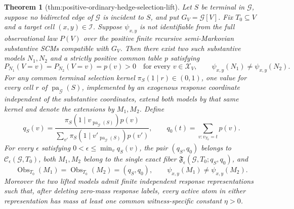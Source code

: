 \documentclass{article}
\newtheorem{theorem}{Theorem}
\begin{document}
\begin{theorem}[thm:positive-ordinary-hedge-selection-lift]\label{thm:positive-ordinary-hedge-selection-lift}
Let \(S\) be terminal in \(\mathcal G\), suppose no bidirected edge of \(\mathcal G\) is incident to \(S\), and put \(G_V=\mathcal G[V]\). Fix \(T_0\subseteq V\) and a target cell \((x,y)\in\mathcal I\). Suppose \(\psi_{x,y}\) is not identifiable from the full observational law \(P(V)\) over the positive finite recursive semi-Markovian substantive SCMs compatible with \(G_V\). Then there exist two such substantive models \(N_1,N_2\) and a strictly positive common table \(p\) satisfying
\[
 P_{N_1}(V=v)=P_{N_2}(V=v)=p(v)>0\quad\text{for every }v\in\mathcal X_V,
 \qquad
 \psi_{x,y}(N_1)\ne\psi_{x,y}(N_2).
\]
For any common terminal selection kernel \(\pi_S(1\mid r)\in(0,1)\), one value for every cell \(r\) of \(\operatorname{pa}_{\mathcal G}(S)\), implemented by an exogenous response coordinate independent of the substantive coordinates, extend both models by that same kernel and denote the extensions by \(M_1,M_2\). Define
\[
 q_S(v)=\frac{\pi_S(1\mid v_{\operatorname{pa}_{\mathcal G}(S)})p(v)}
 {\sum_{v'}\pi_S(1\mid v'_{\operatorname{pa}_{\mathcal G}(S)})p(v')},
 \qquad
 q_0(t)=\sum_{v:v_{T_0}=t}p(v).
\]
For every \(\epsilon\) satisfying \(0<\epsilon\leq\min_v q_S(v)\), the pair \((q_S,q_0)\) belongs to \(\mathcal C_{\epsilon}(\mathcal G,T_0)\), both \(M_1,M_2\) belong to the single exact fiber \(\mathfrak F_{\epsilon}(\mathcal G,T_0;q_S,q_0)\), and
\[
 \operatorname{Obs}_{T_0}(M_1)=\operatorname{Obs}_{T_0}(M_2)=(q_S,q_0),
 \qquad
 \psi_{x,y}(M_1)\ne\psi_{x,y}(M_2).
\]
Moreover the two lifted models admit finite independent response representations such that, after deleting zero-mass response labels, every active atom in either representation has mass at least one common witness-specific constant \(\eta>0\).
\end{theorem}
\end{document}

